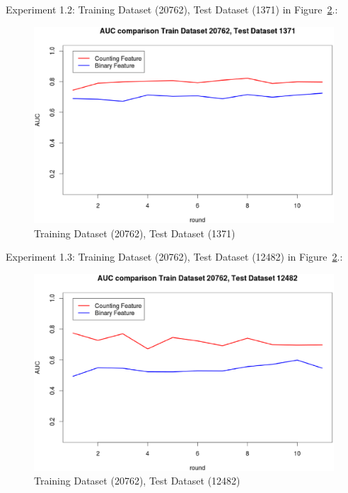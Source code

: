 \documentclass{sig-alternate}
\begin{document}
Experiment 1.2: Training Dataset  (20762), Test Dataset  (1371) in Figure~\ref{fig:fig2}.:
\begin{figure}[h]
\centering
\includegraphics[width=\columnwidth]{20762_1371.eps}
\caption{Training Dataset  (20762), Test Dataset  (1371)}
\label{fig:fig2}
\end{figure}

Experiment 1.3: Training Dataset  (20762), Test Dataset  (12482) in Figure~\ref{fig:fig2}.:
\begin{figure}[h]
\centering
\includegraphics[width=\columnwidth]{20762_12482.eps}
\caption{ Training Dataset  (20762), Test Dataset  (12482)}
\label{fig:fig2}
\end{figure}
\end{document}
